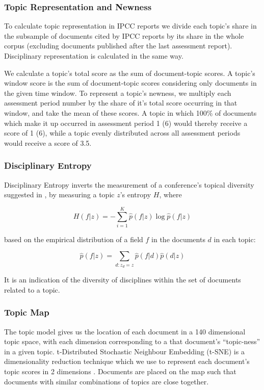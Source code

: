 \documentclass{article}
\begin{document}
\begin{linenumbers}
		
		\subsubsection*{Topic Representation and Newness}
		
		To calculate topic representation in IPCC reports we divide each topic's share in the subsample of documents cited by IPCC reports by its share in the whole corpus (excluding documents published after the last assessment report). Disciplinary representation is calculated in the same way.
		
		We calculate a topic's total score as the sum of document-topic scores. A topic's window score is the sum of document-topic scores considering only documents in the given time window. To represent a topic's newness, we multiply each assessment period number by the share of it's total score occurring in that window, and take the mean of these scores. A topic in which 100\% of documents which make it up occurred in assessment period 1 (6) would thereby receive a score of 1 (6), while a topic evenly distributed across all assessment periods would receive a score of 3.5.
		
		
		\subsubsection*{Disciplinary Entropy}
		
		Disciplinary Entropy inverts the measurement of a conference's topical diversity suggested in \cite{Hall2008}, by measuring a topic \(z\)'s entropy \(H\), where 
		
		\begin{equation}
		H(f|z) = -\sum_{i=1}^K \hat{p}(f|z) \log \hat{p}(f|z) 
		\end{equation}
		
		based on the empirical distribution of a field \(f\) in the documents \(d\) in each topic:
		
		\begin{equation}
		\hat{p}(f|z) = \sum_{d:z_d=z} \hat{p} (f|d) \hat{p} (d|z)
		\end{equation}
		
		It is an indication of the diversity of disciplines within the set of documents related to a topic. 
		
		\subsubsection*{Topic Map}
		The topic model gives us the location of each document in a 140 dimensional topic space, with each dimension corresponding to a that document's ``topic-ness'' in a given topic. t-Distributed Stochastic Neighbour Embedding (t-SNE) is a dimensionality reduction technique which we use to represent each document's topic scores in 2 dimensions \cite{vandermaaten2008}. Documents are placed on the map such that documents with similar combinations of topics are close together.
		

\end{linenumbers}
\end{document}
